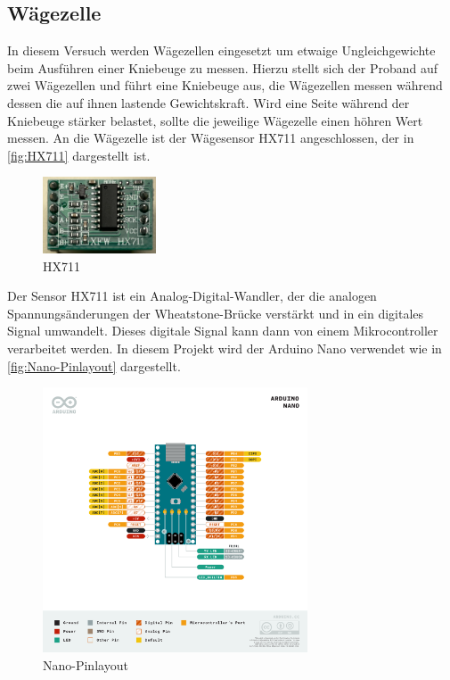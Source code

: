 \subsection{Wägezelle}
In diesem Versuch werden Wägezellen eingesetzt um etwaige Ungleichgewichte beim Ausführen einer Kniebeuge zu messen.
Hierzu stellt sich der Proband auf zwei Wägezellen und führt eine Kniebeuge aus, die Wägezellen messen während dessen die auf ihnen lastende Gewichtskraft.
Wird eine Seite während der Kniebeuge stärker belastet, sollte die jeweilige Wägezelle einen höhren Wert messen.
An die Wägezelle ist der Wägesensor HX711 angeschlossen, der in \autoref{fig:HX711} dargestellt ist.
\\
\begin{figure}[h!]
    \centering
    \includegraphics[width=0.3\textwidth]{img/HX711.png}
    \caption{HX711 \cite{prilchen}}
    \label{fig:HX711}
\end{figure}
Der Sensor HX711 ist ein Analog-Digital-Wandler, der die analogen Spannungsänderungen der Wheatstone-Brücke verstärkt und in ein digitales Signal umwandelt.
Dieses digitale Signal kann dann von einem Mikrocontroller verarbeitet werden.
In diesem Projekt wird der Arduino Nano verwendet wie in \autoref{fig:Nano-Pinlayout} dargestellt.
\\
\begin{figure}[h!]
    \centering
    \includegraphics[width=0.7\textwidth]{img/Nano-Pinlayout.png}
    \caption{Nano-Pinlayout \cite{Arduino}}
    \label{fig:Nano-Pinlayout}
\end{figure}
